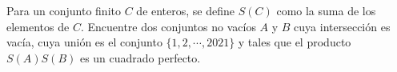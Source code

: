 Para un conjunto finito $C$ de enteros, se define $S(C)$ como la suma de los elementos de $C$. Encuentre dos conjuntos no vacíos $A$ y $B$ cuya intersección es vacía, cuya unión es el conjunto $\{ 1,2,\cdots ,2021 \}$ y tales que el producto $S(A)S(B)$ es un cuadrado perfecto.
